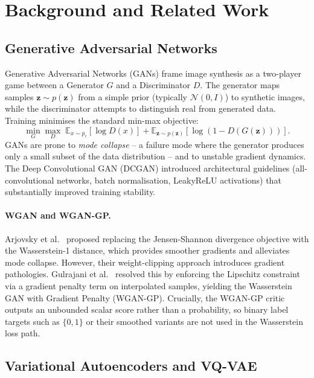 \documentclass[12pt,a4paper]{article}
\begin{document}
\section{Background and Related Work}
\label{sec:background}

\subsection{Generative Adversarial Networks}

Generative Adversarial Networks (GANs) \cite{gan} frame image synthesis as a
two-player game between a Generator $G$ and a Discriminator $D$.  The generator
maps samples $\mathbf{z} \sim p(\mathbf{z})$ from a simple prior (typically
$\mathcal{N}(0,I)$) to synthetic images, while the discriminator attempts to
distinguish real from generated data.  Training minimises the standard
min-max objective:
\begin{equation}
  \min_G \max_D\; \mathbb{E}_{x\sim p_r}[\log D(x)]
                + \mathbb{E}_{\mathbf{z}\sim p(\mathbf{z})}[\log(1-D(G(\mathbf{z})))].
\end{equation}
GANs are prone to \emph{mode collapse} -- a failure mode where the generator
produces only a small subset of the data distribution -- and to unstable
gradient dynamics.  The Deep Convolutional GAN (DCGAN) \cite{dcgan} introduced
architectural guidelines (all-convolutional networks, batch normalisation,
LeakyReLU activations) that substantially improved training stability.

\paragraph{WGAN and WGAN-GP.}
Arjovsky et al.\ \cite{wgan} proposed replacing the Jensen-Shannon divergence
objective with the Wasserstein-1 distance, which provides smoother gradients
and alleviates mode collapse.  However, their weight-clipping approach
introduces gradient pathologies.  Gulrajani et al.\ \cite{wgangp} resolved
this by enforcing the Lipschitz constraint via a gradient penalty term on
interpolated samples, yielding the Wasserstein GAN with Gradient Penalty
(WGAN-GP).  Crucially, the WGAN-GP critic outputs an unbounded scalar score
rather than a probability, so binary label targets such as $\{0, 1\}$ or
their smoothed variants are not used in the Wasserstein loss path.

\subsection{Variational Autoencoders and VQ-VAE}
\end{document}
